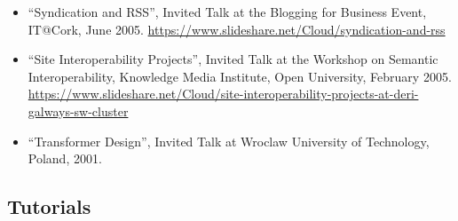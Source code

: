 \documentclass[10pt,a4paper]{res} %
\begin{document}
\begin{resume}
\begin{itemize}
\item ``Syndication and RSS'', Invited Talk at the Blogging for Business Event, IT@Cork, June 2005. \url{https://www.slideshare.net/Cloud/syndication-and-rss}
\item ``Site Interoperability Projects'', Invited Talk at the Workshop on Semantic Interoperability, Knowledge Media Institute, Open University, February 2005. \url{https://www.slideshare.net/Cloud/site-interoperability-projects-at-deri-galways-sw-cluster}
\item ``Transformer Design'', Invited Talk at Wroclaw University of Technology, Poland, 2001. %
\end{itemize}

\subsection*{Tutorials}


\end{resume}
\end{document}
